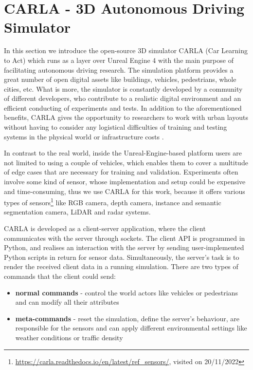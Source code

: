 \section{CARLA - 3D Autonomous Driving Simulator}\label{carla_background}
In this section we introduce the open-source 3D simulator CARLA (Car Learning to Act) which runs as a layer over Unreal Engine 4 with the main purpose of facilitating autonomous driving research. The simulation platform provides a great number of open digital assets like buildings, vehicles, pedestrians, whole cities, etc. What is more, the simulator is constantly developed by a community of different developers, who contribute to a realistic digital environment and an efficient conducting of experiments and tests. In addition to the aforementioned benefits, CARLA gives the opportunity to researchers to work with urban layouts without having to consider any logistical difficulties of training and testing systems in the physical world or infrastructure costs \cite{carla_paper}. 

In contrast to the real world, inside the Unreal-Engine-based platform users are not limited to using a couple of vehicles, which enables them to cover a multitude of edge cases that are necessary for training and validation. Experiments often involve some kind of sensor, whose implementation and setup could be expensive and time-consuming, thus we use CARLA for this work, because it offers various types of sensors\footnote{\url{https://carla.readthedocs.io/en/latest/ref_sensors/}, visited on 20/11/2022} like RGB camera, depth camera, instance and semantic segmentation camera, LiDAR and radar systems.

CARLA is developed as a client-server application, where the client communicates with the server through sockets. The client API is programmed in Python, and realises an interaction with the server by sending user-implemented Python scripts in return for sensor data. Simultaneously, the server's task is to render the received client data in a running simulation. There are two types of commands that the client could send:
\begin{itemize}
    \item \textbf{normal commands} - control the world actors like vehicles or pedestrians and can modify all their attributes
    \item \textbf{meta-commands} - reset the simulation, define the server's behaviour, are responsible for the sensors and can apply different environmental settings like weather conditions or traffic density
\end{itemize}

